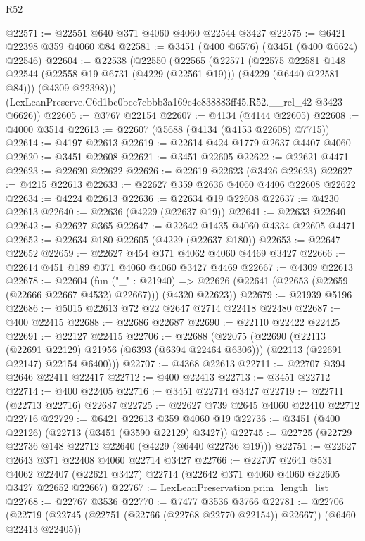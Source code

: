 \begin{lexlean}{R52}
\begin{coremodule}
@22571 := @22551 @640 @371 @4060 @4060 @22544 @3427
@22575 := @6421 @22398 @359 @4060 @84
@22581 := @3451 (@400 @6576) (@3451 (@400 @6624) @22546)
@22604 := @22538
    (@22550
      (@22565
        (@22571
          (@22575
            @22581
            @148
            @22544
            (@22558 @19 @6731 (@4229 (@22561 @19)))
            (@4229 (@6440 @22581 @84)))
          (@4309 @22398)))
      (LexLeanPreserve.C6d1bc0bcc7cbbb3a169c4e838883ff45.R52.__rel_42 @3423 @6626))
@22605 := @3767 @22154
@22607 := @4134 (@4144 @22605)
@22608 := @4000 @3514
@22613 := @22607 (@5688 (@4134 (@4153 @22608) @7715))
@22614 := @4197 @22613
@22619 := @22614 @424 @1779 @2637 @4407 @4060
@22620 := @3451 @22608
@22621 := @3451 @22605
@22622 := @22621 @4471
@22623 := @22620 @22622
@22626 := @22619 @22623 (@3426 @22623)
@22627 := @4215 @22613
@22633 := @22627 @359 @2636 @4060 @4406 @22608 @22622
@22634 := @4224 @22613
@22636 := @22634 @19 @22608
@22637 := @4230 @22613
@22640 := @22636 (@4229 (@22637 @19))
@22641 := @22633 @22640
@22642 := @22627 @365
@22647 := @22642 @1435 @4060 @4334 @22605 @4471
@22652 := @22634 @180 @22605 (@4229 (@22637 @180))
@22653 := @22647 @22652
@22659 := @22627 @454 @371 @4062 @4060 @4469 @3427
@22666 := @22614 @451 @189 @371 @4060 @4060 @3427 @4469
@22667 := @4309 @22613
@22678 := @22604
    (fun ("_" : @21940) =>
    @22626 (@22641 (@22653 (@22659 (@22666 @22667 @4532) @22667))) (@4320 @22623))
@22679 := @21939 @5196
@22686 := @5015 @22613 @72 @22 @2647 @2714 @22418 @22480
@22687 := @400 @22415
@22688 := @22686 @22687
@22690 := @22110 @22422 @22425
@22691 := @22127 @22415
@22706 := @22688
    (@22075
      (@22690
        (@22113 (@22691 @22129) @21956 (@6393 (@6394 @22464 @6306)))
        (@22113 (@22691 @22147) @22154 @6400)))
@22707 := @4368 @22613
@22711 := @22707 @394 @2646 @22411 @22417
@22712 := @400 @22413
@22713 := @3451 @22712
@22714 := @400 @22405
@22716 := @3451 @22714 @3427
@22719 := @22711 (@22713 @22716) @22687
@22725 := @22627 @739 @2645 @4060 @22410 @22712 @22716
@22729 := @6421 @22613 @359 @4060 @19
@22736 := @3451 (@400 @22126) (@22713 (@3451 (@3590 @22129) @3427))
@22745 := @22725 (@22729 @22736 @148 @22712 @22640 (@4229 (@6440 @22736 @19)))
@22751 := @22627 @2643 @371 @22408 @4060 @22714 @3427
@22766 := @22707
    @2641
    @531
    @4062
    @22407
    (@22621 @3427)
    @22714
    (@22642 @371 @4060 @4060 @22605 @3427 @22652 @22667)
@22767 := LexLeanPreservation.prim_length_list
@22768 := @22767 @3536
@22770 := @7477 @3536 @3766
@22781 := @22706
    (@22719 (@22745 (@22751 (@22766 (@22768 @22770 @22154)) @22667)) (@6460 @22413 @22405))

\end{coremodule}
\end{lexlean}
